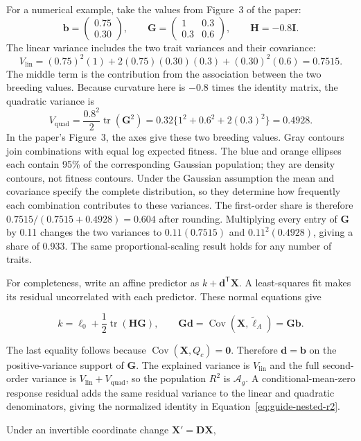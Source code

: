 \documentclass[11pt]{article}
\newcommand{\vect}[1]{\boldsymbol{#1}}
\newcommand{\mat}[1]{\mathbf{#1}}
\newcommand{\Cov}{\operatorname{Cov}}
\newcommand{\tr}{\operatorname{tr}}
\newcommand{\Ag}{\ensuremath{\mathcal A_g}}
\newcommand{\Vlin}{\ensuremath{V_{\mathrm{lin}}}}
\newcommand{\Vquad}{\ensuremath{V_{\mathrm{quad}}}}
\begin{document}
For a numerical example, take the values from Figure~3 of the paper:
\[
\vect b=\begin{pmatrix}0.75\\0.30\end{pmatrix},\qquad
\mat G=\begin{pmatrix}1&0.3\\0.3&0.6\end{pmatrix},\qquad
\mat H=-0.8\mat I.
\]
The linear variance includes the two trait variances and their covariance:
\[
\Vlin=(0.75)^2(1)+2(0.75)(0.30)(0.3)+(0.30)^2(0.6)=0.7515.
\]
The middle term is the contribution from the association between the two breeding values. Because curvature here is $-0.8$ times the identity matrix, the quadratic variance is
\[
\Vquad=\frac{0.8^2}{2}\tr(\mat G^2)
=0.32\{1^2+0.6^2+2(0.3)^2\}=0.4928.
\]
In the paper's Figure~3, the axes give these two breeding values. Gray contours join combinations with equal log expected fitness. The blue and orange ellipses each contain 95\% of the corresponding Gaussian population; they are density contours, not fitness contours. Under the Gaussian assumption the mean and covariance specify the complete distribution, so they determine how frequently each combination contributes to these variances. The first-order share is therefore $0.7515/(0.7515+0.4928)=0.604$ after rounding. Multiplying every entry of $\mat G$ by 0.11 changes the two variances to $0.11(0.7515)$ and $0.11^2(0.4928)$, giving a share of 0.933. The same proportional-scaling result holds for any number of traits.

For completeness, write an affine predictor as
$k+\vect d^{\mathsf T}\vect X$.  A least-squares fit makes its residual
uncorrelated with each predictor.  These normal equations give

\begin{equation}
k=\ell_0+\frac12\tr(\mat H\mat G),
\qquad
\mat G\vect d
=\Cov(\vect X,\widetilde\ell_A)
=\mat G\vect b.
\end{equation}

The last equality follows because $\Cov(\vect X,Q_c)=\vect0$.  Therefore
$\vect d=\vect b$ on the positive-variance support of $\mat G$.  The explained
variance is $\Vlin$ and the full second-order variance is
$\Vlin+\Vquad$, so the population $R^2$ is \Ag.  A
conditional-mean-zero response residual adds the same residual variance to the
linear and quadratic denominators, giving the normalized identity in
Equation~\eqref{eq:guide-nested-r2}.

Under an invertible coordinate change $\vect X'=\mat D\vect X$,
\end{document}
